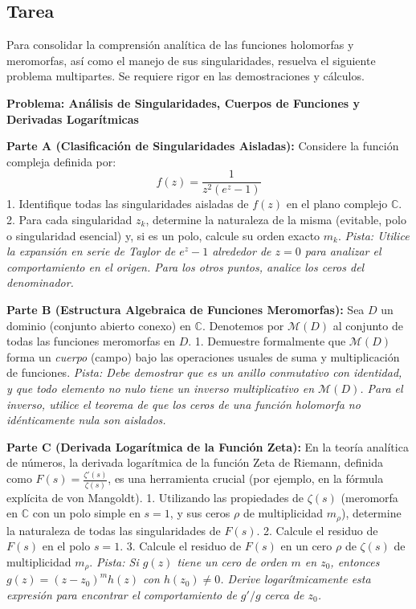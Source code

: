 \documentclass[a4paper]{article}
\begin{document}
\subsection{Tarea}

Para consolidar la comprensión analítica de las funciones holomorfas y meromorfas, así como el manejo de sus singularidades, resuelva el siguiente problema multipartes. Se requiere rigor en las demostraciones y cálculos.

\textbf{Problema: Análisis de Singularidades, Cuerpos de Funciones y Derivadas Logarítmicas}

\textbf{Parte A (Clasificación de Singularidades Aisladas):}
Considere la función compleja definida por:
$$ f(z) = \frac{1}{z^2 (e^z - 1)} $$
1. Identifique todas las singularidades aisladas de $f(z)$ en el plano complejo $\mathbb{C}$.
2. Para cada singularidad $z_k$, determine la naturaleza de la misma (evitable, polo o singularidad esencial) y, si es un polo, calcule su orden exacto $m_k$.
\textit{Pista: Utilice la expansión en serie de Taylor de $e^z - 1$ alrededor de $z=0$ para analizar el comportamiento en el origen. Para los otros puntos, analice los ceros del denominador.}

\textbf{Parte B (Estructura Algebraica de Funciones Meromorfas):}
Sea $D$ un dominio (conjunto abierto conexo) en $\mathbb{C}$. Denotemos por $\mathcal{M}(D)$ al conjunto de todas las funciones meromorfas en $D$.
1. Demuestre formalmente que $\mathcal{M}(D)$ forma un \textit{cuerpo} (campo) bajo las operaciones usuales de suma y multiplicación de funciones.
\textit{Pista: Debe demostrar que es un anillo conmutativo con identidad, y que todo elemento no nulo tiene un inverso multiplicativo en $\mathcal{M}(D)$. Para el inverso, utilice el teorema de que los ceros de una función holomorfa no idénticamente nula son aislados.}

\textbf{Parte C (Derivada Logarítmica de la Función Zeta):}
En la teoría analítica de números, la derivada logarítmica de la función Zeta de Riemann, definida como $F(s) = \frac{\zeta'(s)}{\zeta(s)}$, es una herramienta crucial (por ejemplo, en la fórmula explícita de von Mangoldt).
1. Utilizando las propiedades de $\zeta(s)$ (meromorfa en $\mathbb{C}$ con un polo simple en $s=1$, y sus ceros $\rho$ de multiplicidad $m_\rho$), determine la naturaleza de todas las singularidades de $F(s)$.
2. Calcule el residuo de $F(s)$ en el polo $s = 1$.
3. Calcule el residuo de $F(s)$ en un cero $\rho$ de $\zeta(s)$ de multiplicidad $m_\rho$.
\textit{Pista: Si $g(z)$ tiene un cero de orden $m$ en $z_0$, entonces $g(z) = (z-z_0)^m h(z)$ con $h(z_0) \neq 0$. Derive logarítmicamente esta expresión para encontrar el comportamiento de $g'/g$ cerca de $z_0$.}
\end{document}
